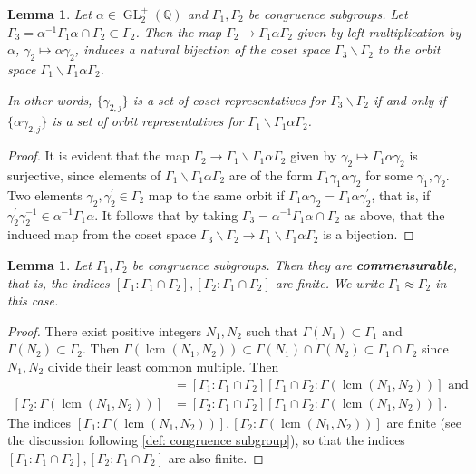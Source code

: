 \documentclass[10pt,leqno,twoside]{article}
\theoremstyle{plain}
\newtheorem{lemma}[lem]{Lemma}
\theoremstyle{definition}
\numberwithin{equation}{section}
\numberwithin{lem}{section}
\newcommand{\textib}[1]{\textbf{\textit{#1\index{#1}}}} %
\DeclareMathOperator{\GL}{GL}
\newcommand{\glqp}{\GL_2^+(\mathbb{Q})}
\DeclareMathOperator{\lcm}{lcm}
\begin{document}
\begin{lemma}\label{lem: double coset coset/orbit spaces}
    Let $\alpha\in\glqp$ and $\varGamma_1,\varGamma_2$ be congruence subgroups. Let $\varGamma_3 = \alpha^{-1}\varGamma_1\alpha\cap \varGamma_2\subset \varGamma_2$. Then the map $\varGamma_2\to \varGamma_1\alpha\varGamma_2$ given by left multiplication by $\alpha$, $\gamma_2\mapsto\alpha\gamma_2$, induces a natural bijection of the coset space $\varGamma_3\backslash\varGamma_2$ to the orbit space $\varGamma_1\backslash\varGamma_1\alpha\varGamma_2$.

    In other words, $\{\gamma_{2,j}\}$ is a set of coset representatives for $\varGamma_3\backslash \varGamma_2$ if and only if $\{\alpha\gamma_{2,j}\}$ is a set of orbit representatives for $\varGamma_1\backslash \varGamma_1\alpha\varGamma_2$.
\end{lemma} 
\begin{proof}
    It is evident that the map $\varGamma_2\to \varGamma_1\backslash\varGamma_1\alpha\varGamma_2$ given by $\gamma_2\mapsto \varGamma_1\alpha\gamma_2$ is surjective, since elements of $\varGamma_1\backslash\varGamma_1\alpha\varGamma_2$ are of the form $\varGamma_1\gamma_1\alpha\gamma_2$ for some $\gamma_1,\gamma_2$. Two elements $\gamma_2,\gamma_2^\prime\in\varGamma_2$ map to the same orbit if $\varGamma_1\alpha\gamma_2 = \varGamma_1\alpha\gamma_2^\prime$, that is, if $\gamma_2^\prime\gamma_2^{-1}\in \alpha^{-1}\varGamma_1\alpha$. It follows that by taking $\varGamma_3 = \alpha^{-1}\varGamma_1\alpha\cap \varGamma_2$ as above, that the induced map from the coset space $\varGamma_3\backslash\varGamma_2\to \varGamma_1\backslash \varGamma_1\alpha\varGamma_2$ is a bijection.
\end{proof}
\begin{lemma}\label{lem: congruence subgroups commensurable}
    Let $\varGamma_1,\varGamma_2$ be congruence subgroups. Then they are \textib{commensurable}, that is, the indices $[\varGamma_1 : \varGamma_1\cap \varGamma_2], [\varGamma_2 : \varGamma_1\cap \varGamma_2]$ are finite. We write $\varGamma_1\approx\varGamma_2$ in this case.
\end{lemma}
\begin{proof}
    There exist positive integers $N_1,N_2$ such that $\varGamma(N_1)\subset \varGamma_1$ and $\varGamma(N_2)\subset \varGamma_2$. Then $\varGamma(\lcm(N_1,N_2))\subset \varGamma(N_1)\cap \varGamma(N_2)\subset \varGamma_1\cap \varGamma_2$ since $N_1,N_2$ divide their least common multiple. Then \begin{align*}
        [\varGamma_1 : \varGamma(\lcm(N_1,N_2))] &= [\varGamma_1 : \varGamma_1\cap \varGamma_2][\varGamma_1\cap \varGamma_2 : \varGamma(\lcm(N_1,N_2))] \text{ and}\\
        [\varGamma_2 : \varGamma(\lcm(N_1,N_2))] &= [\varGamma_2 : \varGamma_1\cap \varGamma_2][\varGamma_1\cap \varGamma_2 : \varGamma(\lcm(N_1,N_2))].
    \end{align*} The indices $[\varGamma_1 : \varGamma(\lcm(N_1,N_2))],[\varGamma_2 : \varGamma(\lcm(N_1,N_2))]$ are finite (see the discussion following \cref{def: congruence subgroup}), so that the indices $[\varGamma_1 : \varGamma_1\cap \varGamma_2], [\varGamma_2 : \varGamma_1\cap \varGamma_2]$ are also finite.
\end{proof}
\end{document}
